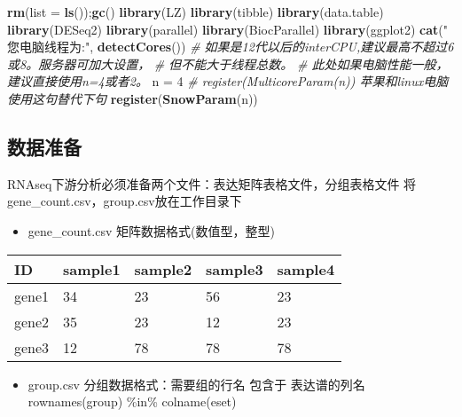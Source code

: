 \documentclass[
]{book}
\newenvironment{Shaded}{\begin{snugshade}}{\end{snugshade}}
\newcommand{\AttributeTok}[1]{\textcolor[rgb]{0.13,0.29,0.53}{#1}}
\newcommand{\CommentTok}[1]{\textcolor[rgb]{0.56,0.35,0.01}{\textit{#1}}}
\newcommand{\DecValTok}[1]{\textcolor[rgb]{0.00,0.00,0.81}{#1}}
\newcommand{\FunctionTok}[1]{\textcolor[rgb]{0.13,0.29,0.53}{\textbf{#1}}}
\newcommand{\NormalTok}[1]{#1}
\newcommand{\OtherTok}[1]{\textcolor[rgb]{0.56,0.35,0.01}{#1}}
\newcommand{\StringTok}[1]{\textcolor[rgb]{0.31,0.60,0.02}{#1}}
\providecommand{\tightlist}{%
  \setlength{\itemsep}{0pt}\setlength{\parskip}{0pt}}
\begin{document}
\begin{Shaded}
\begin{Highlighting}[]
\FunctionTok{rm}\NormalTok{(}\AttributeTok{list =} \FunctionTok{ls}\NormalTok{());}\FunctionTok{gc}\NormalTok{()}
\FunctionTok{library}\NormalTok{(LZ)}
\FunctionTok{library}\NormalTok{(tibble)}
\FunctionTok{library}\NormalTok{(data.table)}
\FunctionTok{library}\NormalTok{(DESeq2)}
\FunctionTok{library}\NormalTok{(parallel)}
\FunctionTok{library}\NormalTok{(BiocParallel)}
\FunctionTok{library}\NormalTok{(ggplot2)}
\FunctionTok{cat}\NormalTok{(}\StringTok{" 您电脑线程为:"}\NormalTok{, }\FunctionTok{detectCores}\NormalTok{())}
\CommentTok{\# 如果是12代以后的interCPU,建议最高不超过6或8。服务器可加大设置，}
\CommentTok{\#  但不能大于线程总数。}
\CommentTok{\# 此处如果电脑性能一般，建议直接使用n=4或者2。}
\NormalTok{n }\OtherTok{=} \DecValTok{4}
\CommentTok{\# register(MulticoreParam(n)) 苹果和linux电脑使用这句替代下句}
\FunctionTok{register}\NormalTok{(}\FunctionTok{SnowParam}\NormalTok{(n))}
\end{Highlighting}
\end{Shaded}

\subsection{数据准备}\label{ux6570ux636eux51c6ux5907}

RNAseq下游分析必须准备两个文件：表达矩阵表格文件，分组表格文件
将gene\_count.csv，group.csv放在工作目录下

\begin{itemize}
\tightlist
\item
  gene\_count.csv 矩阵数据格式(数值型，整型)
\end{itemize}

\begin{longtable}[]{@{}lllll@{}}
\toprule\noalign{}
ID & sample1 & sample2 & sample3 & sample4 \\
\midrule\noalign{}
\endhead
\bottomrule\noalign{}
\endlastfoot
gene1 & 34 & 23 & 56 & 23 \\
gene2 & 35 & 23 & 12 & 23 \\
gene3 & 12 & 78 & 78 & 78 \\
\end{longtable}

\begin{itemize}
\tightlist
\item
  group.csv 分组数据格式：需要组的行名 包含于 表达谱的列名 rownames(group) \%in\% colname(eset)
\end{itemize}
\end{document}
